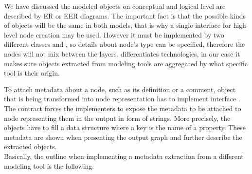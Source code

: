 We have discussed the modeled objects on conceptual and logical level are described by ER or EER diagrams. 
The important fact is that the possible kinds of objects will be the same in both models, that is why a single interface  for high-level node creation may be used.
However it must be implemented by two different classes  and , so details about node's type can be specified, therefore the nodes will not mix between the layers.
 differentiates technologies, in our case it makes sure objects extracted from modeling tools are aggregated by what specific tool is their origin.

To attach metadata about a node, such as its definition or a comment, object that is being transformed into node representation has to implement interface .
The contract forces the implementers to expose the metadata to be attached to node representing them in the output in form of strings. 
More precisely, the objects have to fill a  data structure where a key is the name of a property. 
These metadata are shown when presenting the output graph and further describe the extracted objects. \\ 

Basically, the outline when implementing a metadata extraction from a different modeling tool is the following:

